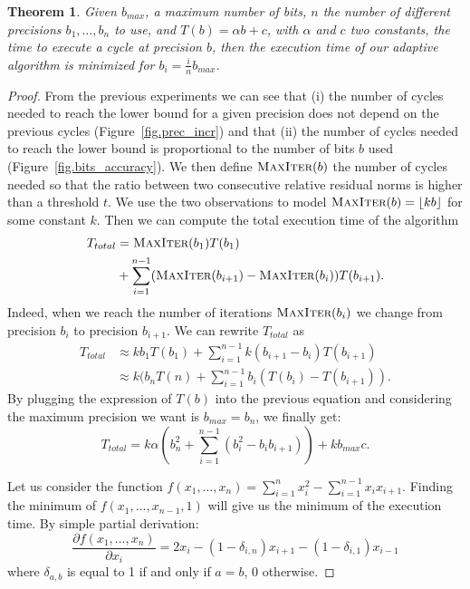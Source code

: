 \documentclass[sigplan]{acmart}
\newtheorem{theorem}{Theorem}
\begin{document}
   \begin{theorem}
     Given $b_{max}$, a maximum number of bits, $n$ the number of different precisions $b_1,\dots,b_n$ to use, and $T(b)=\alpha b+c$, with $\alpha$ and $c$ two constants, the time to execute a cycle at precision $b$, then
     the execution time of our adaptive algorithm is minimized for $b_i = \frac{i}{n}b_{max}$.
   \end{theorem}

   \begin{proof}
   From the previous experiments we can see that (i) the number of cycles needed to reach the lower bound for a given precision does not depend on the previous cycles (Figure~\ref{fig.prec_incr}) and that (ii) the number of cycles
   needed to reach the lower bound is proportional to the number of bits $b$ used (Figure~\ref{fig.bits_accuracy}). We then define $\textsc{MaxIter}(b)$ the number of cycles needed so that the ratio between two consecutive
   relative residual norms is higher than a threshold $t$. We use the two observations to model $\textsc{MaxIter}(b) = \lfloor kb \rfloor$ for some constant $k$.
   Then we can compute the total execution time of the algorithm
   \begin{align*}
   T_{total}& = \textsc{MaxIter}(b_1)T(b_1)\\
   & +  \sum\limits_{i=1}^{n-1} (\textsc{MaxIter}(b_{i+1})-\textsc{MaxIter}(b_i))T(b_{i+1}).
   \end{align*}
   Indeed, when we reach the number of iterations $\textsc{MaxIter}(b_i)$ we change from precision $b_i$ to precision $b_{i+1}$.
   We can rewrite $T_{total}$ as
   \begin{align*}
    T_{total} &\approx k b_{1} T(b_1) + \sum\limits_{i=1}^{n-1} k(b_{i+1}-b_{i})T(b_{i+1})\\
	    & \approx k ( b_{n}T(n) + \sum\limits_{i=1}^{n-1} b_i ( T(b_i) - T(b_{i+1})).
   \end{align*}
   By plugging the expression of $T(b)$ into the previous equation and considering the maximum precision we want is $b_{max}=b_n$, we finally get:
   \begin{equation}
    T_{total}  = k\alpha\left(b_n^2 + \sum\limits_{i=1}^{n-1} (b_i^2 - b_i b_{i+1})\right) + kb_{max}c.
   \end{equation}
   
   Let us consider the function $f(x_1,\dots,x_n) = \sum\limits_{i=1}^n x_i^2 - \sum\limits_{i=1}^{n-1} x_ix_{i+1}$. Finding the minimum of $f(x_1,\dots,x_{n-1},1)$ will give
   us the minimum of the execution time.
   By simple partial derivation:
   \[ \frac{\partial f(x_1,\dots,x_n)}{\partial x_i} = 2x_i - (1-\delta_{i,n})x_{i+1} - (1-\delta_{i,1})x_{i-1} \]
   where $\delta_{a,b} $ is equal to 1 if and only if $a=b$, 0 otherwise.
   

\end{proof}
\end{document}
